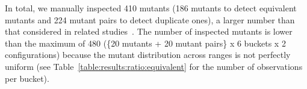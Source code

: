 In total, we manually inspected 410 mutants (186 mutants to detect equivalent mutants and 224 mutant pairs to detect duplicate ones), a larger number than that considered in related studies~\cite{schuler2013covering}. The number of inspected mutants is lower than the maximum of 480 (\{20 mutants + 20 mutant pairs\} x 6 buckets x 2 configurations) because the mutant distribution across ranges is not perfectly uniform (see Table~\ref{table:results:ratio:equivalent} for the number of observations per bucket).

